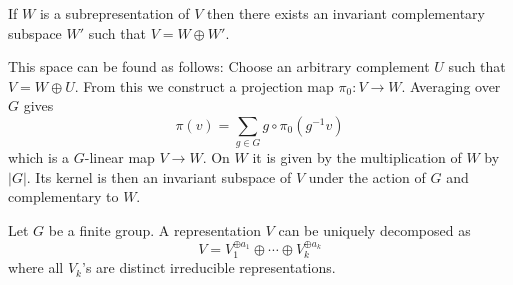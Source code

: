         \begin{property}
        	If $W$ is a subrepresentation of $V$ then there exists an invariant complementary subspace $W'$ such that $V = W \oplus W'$.
            
            This space can be found as follows: Choose an arbitrary complement $U$ such that $V = W \oplus U$. From this we construct a projection map $\pi_0:V \rightarrow W$. Averaging over $G$ gives
            \begin{equation}
            	\pi(v) = \sum_{g\in G}g\circ\pi_0(g^{-1}v)
            \end{equation}
            which is a $G$-linear map $V\rightarrow W$. On $W$ it is given by the multiplication of $W$ by $|G|$. Its kernel is then an invariant subspace of $V$ under the action of $G$ and complementary to $W$.
        \end{property}
        \begin{property}
        	Let $G$ be a finite group. A representation $V$ can be uniquely decomposed as
            \begin{equation}
            	V = V_1^{\oplus a_1}\oplus\cdots\oplus V_k^{\oplus a_k}
            \end{equation}
            where all $V_k$'s are distinct irreducible representations.
        \end{property}
